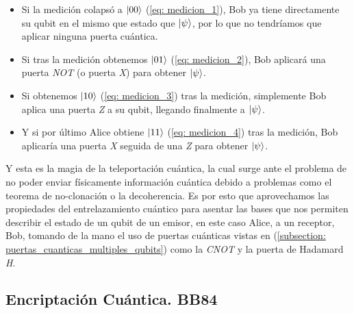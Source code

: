 \documentclass[12pt]{article}
\numberwithin{equation}{section} %
\begin{document}
    \begin{itemize}
        \item Si la medición colapsó a \( \ket{0 0} \) (\ref{eq: medicion_1}), Bob ya tiene directamente su qubit en el mismo que estado que \( \ket{\psi} \), por lo que no tendríamos que aplicar ninguna puerta cuántica.
        \item Si tras la medición obtenemos \( \ket{0 1} \) (\ref{eq: medicion_2}), Bob aplicará una puerta \textit{NOT} (o puerta \textit{X}) para obtener \( \ket{\psi} \).
        \item Si obtenemos \( \ket{1 0} \) (\ref{eq: medicion_3}) tras la medición, simplemente Bob aplica una puerta \textit{Z} a su qubit, llegando finalmente a \( \ket{\psi} \).
        \item Y si por último Alice obtiene \( \ket{1 1} \) (\ref{eq: medicion_4}) tras la medición, Bob aplicaría una puerta \textit{X} seguida de una \textit{Z} para obtener \( \ket{\psi} \).
    \end{itemize}

    \vspace{5mm}

    Y esta es la magia de la teleportación cuántica, la cual surge ante el problema de no poder enviar físicamente información cuántica debido a problemas como el teorema de no-clonación o la decoherencia. Es por esto que aprovechamos las propiedades del entrelazamiento cuántico para asentar las bases que nos permiten describir el estado de un qubit de un emisor, en este caso Alice, a un receptor, Bob, tomando de la mano el uso de puertas cuánticas vistas en (\ref{subsection: puertas_cuanticas_multiples_qubits}) como la \textit{CNOT} y la puerta de Hadamard \textit{H}.

    \vspace{5mm}





    \subsection{Encriptación Cuántica. BB84}

    \vspace{5mm}



    \vspace{10mm}
\end{document}

